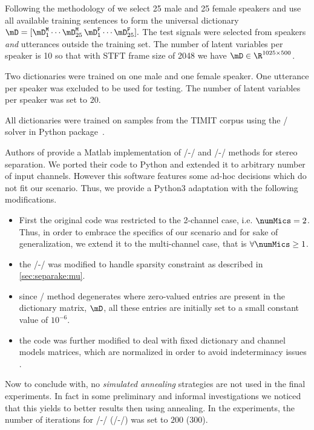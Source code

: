  Following the methodology of  we select 25 male and 25 female speakers
and use all available training sentences to form the universal dictionary
$
    \mD = [\mD_1^\mathtt{M}\cdots \mD_{25}^\mathtt{M}\,\mD_{1}^\mathtt{F}\cdots\mD_{25}^\mathtt{F}].
$
The test signals were selected from speakers \emph{and} utterances outside the training set.
The number of latent variables per speaker is 10 so that with STFT frame size of 2048 we have $\mD\in\R^{1025\times500}$.

Two dictionaries were trained on one male and one female speaker.
One utterance per speaker was excluded to be used for testing.
The number of latent variables per speaker was set to $20$.

\mynewline
All dictionaries were trained on samples from the TIMIT corpus  using the \NMF/ solver in  Python package~.

 Authors of  provide a Matlab implementation of \MU/-\NMF/ and \EM/-\NMF/ methods for stereo separation.
We ported their code to Python and extended it to arbitrary number of input channels.
However this software features some ad-hoc decisions which do not fit our scenario.
Thus, we provide a Python3 adaptation with the following modifications.
\begin{itemize}
    \item First the original code was restricted to the 2-channel case, i.e.  $\numMics = 2$.
    Thus, in order to embrace the specifics of our scenario and for sake of generalization, we extend it to the multi-channel case, that is $\forall \numMics \geq 1$.
    \item the \MU/-\NMF/ was modified to handle sparsity constraint as described in \ref{sec:separake:mu}.
    \item since \EM/ method degenerates where zero-valued entries are present in the dictionary matrix, $\mD$, all these entries are initially set to a small constant value of $10^{-6}$.
    \item the code was further modified to deal with fixed dictionary and channel models matrices, which are normalized in order to avoid indeterminacy issues .
\end{itemize}
Now to conclude with, no \textit{simulated annealing} strategies are not used in the final experiments.
In fact in some preliminary and informal investigations we noticed that this yields to better results then using annealing.
In the experiments, the number of iterations for \MU/-\NMF/ (\EM/-\NMF/) was set to $200$ ($300$).

